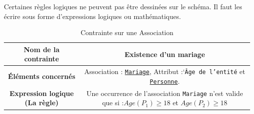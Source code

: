 Certaines règles logiques ne peuvent pas être dessinées sur le schéma. Il faut les écrire sous forme d'expressions logiques ou mathématiques.

\begin{table}[h]
\centering
\begin{tabular}{|c|c|}
\hline
\textbf{Nom de la contrainte} & Existence d'un mariage \\
\hline
\textbf{Éléments concernés} & Association : \underline{\texttt{Mariage}}, Attribut :`\texttt{Âge de l'entité} et \underline{\texttt{Personne}}. \\
\hline
\textbf{Expression logique (La règle)} & Une occurrence de l'association \texttt{Mariage} n'est valide que si :$Age(P_1) \geq 18$ et $Age(P_2) \geq 18$ \\
\hline
\hline
\end{tabular}
\caption{ Contrainte sur une Association }
\end{table}
